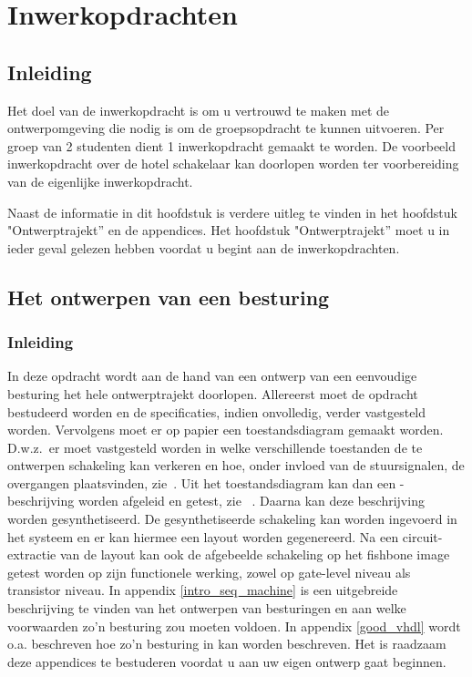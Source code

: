 
\section{Inwerkopdrachten}

\subsection{Inleiding}
Het doel van de inwerkopdracht is om u vertrouwd te maken met de ontwerpomgeving
die nodig is om de groeps\-opdracht te kunnen uitvoeren.
Per groep van 2 studenten dient 1 inwerkopdracht gemaakt te worden.
De voorbeeld inwerkopdracht over de hotel schakelaar
kan doorlopen worden ter voorbereiding
van de eigenlijke inwerkopdracht.

Naast de informatie in dit hoofdstuk is verdere uitleg te vinden in het 
hoofdstuk "Ont\-werptrajekt'' en de appendices. 
Het hoofdstuk "Ontwerptrajekt'' moet u in
ieder geval gelezen hebben voordat u begint aan de inwerkopdrachten.
\subsection{Het ontwerpen van een besturing}

\subsubsection{Inleiding}

In deze opdracht wordt aan de hand van een ontwerp van een eenvoudige besturing
het hele ont\-werptrajekt doorlopen.
Allereerst moet de opdracht bestudeerd worden en de specificaties, indien onvolledig,
verder vastgesteld worden. 
Vervolgens moet er op papier een toestandsdiagram gemaakt worden.
D.w.z.\ er moet vastgesteld 
worden in welke verschillende toestanden de te ontwerpen schakeling kan verkeren en hoe,
onder invloed van de stuursignalen,
de overgangen plaatsvinden, zie~\cite{DT}.
Uit het toestandsdiagram kan dan een -beschrijving worden afgeleid en
getest, zie ~\cite{DTVHDL}.
Daarna kan deze beschrijving worden gesynthetiseerd.
De gesynthetiseerde schakeling kan worden ingevoerd in het  systeem
en er kan hiermee een layout worden gegenereerd.
Na een circuit-extractie van de lay\-out
kan ook de afgebeelde schakeling op het
fishbone image getest worden op zijn functionele werking,
zowel op  gate-level niveau als transistor niveau.
In appendix \ref{intro_seq_machine} is 
een uitgebreide beschrijving te vinden van het ontwerpen van 
besturingen en aan welke voorwaarden zo'n besturing zou moeten voldoen.
In appendix \ref{good_vhdl} wordt
o.a. beschreven hoe zo'n besturing in 
kan worden beschreven.
Het is raadzaam deze appendices te bestuderen voordat u aan uw 
eigen ontwerp gaat beginnen.

